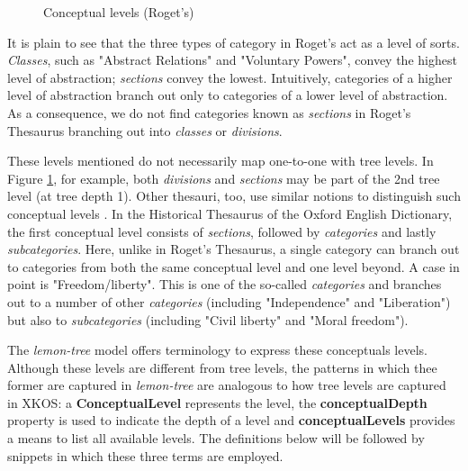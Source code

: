 \begin{figure}[htbp]
	\framebox[\textwidth]{
		\scalebox{0.5}[0.5]{
			
		}
	}
	\caption[]{\label{fig:Stolk2019a:Roget-ConceptualLevel} Conceptual levels (Roget's)}
\end{figure} 

It is plain to see that the three types of category in Roget's act as a level of sorts. 
\emph{Classes}, such as "Abstract Relations" and "Voluntary Powers", convey the highest level of abstraction; \emph{sections} convey the lowest. 
Intuitively, categories of a higher level of abstraction branch out only to categories of a lower level of abstraction. 
As a consequence, we do not find categories known as \emph{sections} in Roget's Thesaurus branching out into \emph{classes} or \emph{divisions}. 

These levels mentioned do not necessarily map one-to-one with tree levels. 
In Figure \ref{fig:Stolk2019a:Roget-ConceptualLevel}, for example, both \emph{divisions} and \emph{sections} may be part of the 2nd tree level (at tree depth 1). 
Other thesauri, too, use similar notions to distinguish such conceptual levels \cite{ref-HTOED} \cite{ref-LSM}. 
In the Historical Thesaurus of the Oxford English Dictionary, the first conceptual level consists of \emph{sections}, followed by \emph{categories} and lastly \emph{subcategories}. 
Here, unlike in Roget's Thesaurus, a single category can branch out to categories from both the same conceptual level and one level beyond. 
A case in point is "Freedom/liberty". This is one of the so-called \emph{categories} and branches out to a number of other \emph{categories} (including "Independence" and "Liberation") but also to \emph{subcategories} (including "Civil liberty" and "Moral freedom").


The \emph{lemon-tree} model offers terminology to express these conceptuals levels. 
Although these levels are different from tree levels, the patterns in which thee former are captured in \emph{lemon-tree} are analogous to how tree levels are captured in XKOS:
a \textbf{ConceptualLevel} represents the level, the \textbf{conceptualDepth} property is used to indicate the depth of a level and \textbf{conceptualLevels} provides a means to list all available levels. The definitions below will be followed by snippets in which these three terms are employed.
\\

\\

